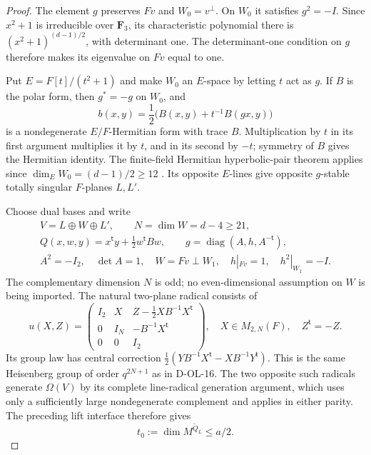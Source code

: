 \begin{proof}
The element $g$ preserves $Fv$ and $W_0=v^\perp$.
On $W_0$ it satisfies $g^2=-I$.  Since $x^2+1$ is irreducible
over $\mathbf F_3$, its characteristic polynomial there is
$(x^2+1)^{(d-1)/2}$, with determinant one.
The determinant-one condition on $g$ therefore makes its
eigenvalue on $Fv$ equal to one.

Put $E=F[t]/(t^2+1)$ and make $W_0$ an $E$-space by
letting $t$ act as $g$.  If $B$ is the polar form, then
$g^*=-g$ on $W_0$, and
\[
 b(x,y)=\frac12\bigl(B(x,y)+t^{-1}B(gx,y)\bigr)              \tag{OSP.5}
\]
is a nondegenerate $E/F$-Hermitian form with trace $B$.
Multiplication by $t$ in its first argument multiplies it by
$t$, and in its second by $-t$; symmetry of $B$ gives the
Hermitian identity.  The finite-field Hermitian hyperbolic-pair
theorem applies since $\dim_EW_0=(d-1)/2\ge12$
\cite[Lemma~10.2, Corollary~10.3 and ensuing decomposition,
pp.~116--117]{OS:Taylor1992}.
Its opposite $E$-lines give opposite $g$-stable totally
singular $F$-planes $L,L'$.

Choose dual bases and write
\[
 \begin{gathered}
 V=L\oplus W\oplus L',\qquad N=\dim W=d-4\ge21,\\
 Q(x,w,y)=x^{\mathsf t}y+\tfrac12w^{\mathsf t}Bw,\qquad
 g=\operatorname{diag}(A,h,A^{-\mathsf t}),\\
 A^2=-I_2,\quad \det A=1,\quad
 W=Fv\perp W_1,\quad h|_{Fv}=1,\quad h^2|_{W_1}=-I.
 \end{gathered}                                             \tag{OSP.6}
\]
The complementary dimension $N$ is odd; no even-dimensional
assumption on $W$ is being imported.
The natural two-plane radical consists of
\[
 u(X,Z)=
 \begin{pmatrix}
 I_2&X&Z-\frac12XB^{-1}X^{\mathsf t}\\
 0&I_N&-B^{-1}X^{\mathsf t}\\
 0&0&I_2
 \end{pmatrix},
 \quad X\in M_{2,N}(F),\quad Z^{\mathsf t}=-Z.               \tag{OSP.7}
\]
Its group law has central correction
$\frac12(YB^{-1}X^{\mathsf t}-XB^{-1}Y^{\mathsf t})$.
This is the same Heisenberg group of order $q^{2N+1}$
as in D-OL-16.  The two opposite such radicals generate
$\Omega(V)$ by its complete line-radical generation argument,
which uses only a sufficiently large nondegenerate complement
and applies in either parity.  The preceding lift interface
therefore gives
\[
                     t_0:=\dim M^{\widetilde Q_L}\le a/2.   \tag{OSP.8}
\]


\end{proof}
